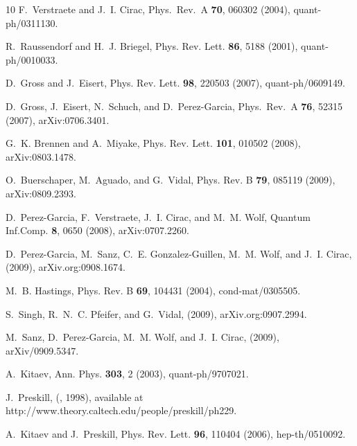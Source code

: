 \documentclass{article}
\theoremstyle{plain}
\theoremstyle{definition}
\numberwithin{equation}{section}  %
\begin{document}
\begin{thebibliography}{10}
    F.~Verstraete and J.~I. Cirac,
    \newblock Phys.~Rev.~A {\bf 70}, 060302 (2004), quant-ph/0311130.

    R.~Raussendorf and H.~J. Briegel,
    \newblock Phys. Rev. Lett. {\bf 86}, 5188 (2001), quant-ph/0010033.

    D.~Gross and J.~Eisert,
    \newblock Phys. Rev. Lett. {\bf 98}, 220503 (2007), quant-ph/0609149.

    D.~Gross, J.~Eisert, N.~Schuch, and D.~Perez-Garcia,
    \newblock Phys.\ Rev.\ A {\bf 76}, 52315 (2007), arXiv:0706.3401.

    G.~K. Brennen and A.~Miyake,
    \newblock Phys. Rev. Lett. {\bf 101}, 010502 (2008), arXiv:0803.1478.

    O.~Buerschaper, M.~Aguado, and G.~Vidal,
    \newblock Phys. Rev. B {\bf 79}, 085119 (2009), arXiv:0809.2393.

    D.~Perez-Garcia, F.~Verstraete, J.~I. Cirac, and M.~M. Wolf,
    \newblock Quantum Inf.Comp. {\bf 8}, 0650 (2008), arXiv:0707.2260.

    D.~Perez-Garcia, M.~Sanz, C.~E. Gonzalez-Guillen, M.~M. Wolf, and J.~I. Cirac,
    \newblock (2009), arXiv.org:0908.1674.

    M.~B. Hastings,
    \newblock Phys. Rev. B {\bf 69}, 104431 (2004), cond-mat/0305505.

    S.~Singh, R.~N.~C. Pfeifer, and G.~Vidal,
    \newblock (2009), arXiv.org:0907.2994.

    M.~Sanz, D.~Perez-Garcia, M.~M. Wolf, and J.~I. Cirac,
    \newblock (2009), arXiv/0909.5347.

    A.~Kitaev,
    \newblock Ann. Phys. {\bf 303}, 2 (2003), quant-ph/9707021.

    J.~Preskill,
     (, 1998),
    \newblock available at
        {http://www.theory.caltech.edu/\hspace{0ex}people/preskill/ph229}.

    A.~Kitaev and J.~Preskill,
    \newblock Phys. Rev. Lett. {\bf 96}, 110404 (2006), hep-th/0510092.


\end{thebibliography}
\end{document}
